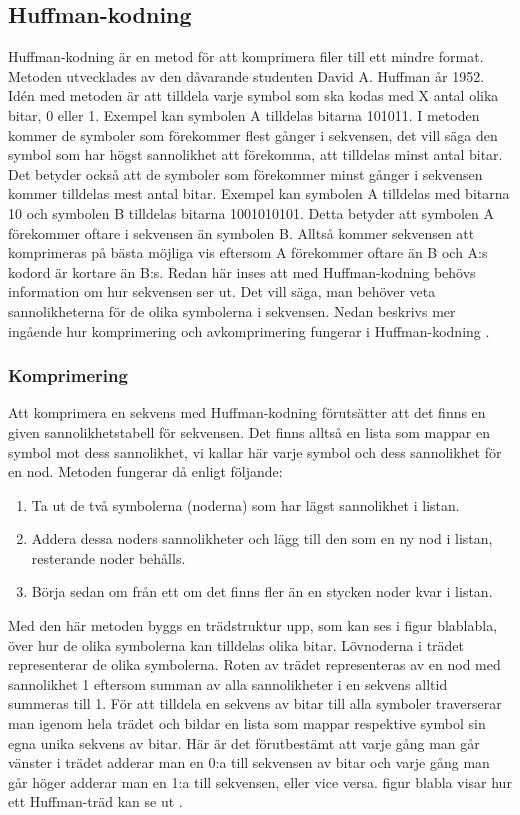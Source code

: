 \subsection{Huffman-kodning}
Huffman-kodning är en metod för att komprimera filer till ett mindre format. Metoden utvecklades av  den dåvarande studenten David A. Huffman år 1952. Idén med metoden är att tilldela varje symbol som ska kodas med X antal olika bitar, 0 eller 1. Exempel kan symbolen A tilldelas bitarna 101011. I metoden kommer de symboler som förekommer flest gånger i sekvensen, det vill säga den symbol som har högst sannolikhet att förekomma, att tilldelas minst antal bitar. Det betyder också att de symboler som förekommer minst gånger i sekvensen kommer tilldelas mest antal bitar. Exempel kan symbolen A tilldelas med bitarna 10 och symbolen B tilldelas bitarna 1001010101. Detta betyder att symbolen A förekommer oftare i sekvensen än symbolen B. Alltså kommer sekvensen att komprimeras på bästa möjliga vis eftersom A förekommer oftare än B och A:s kodord är kortare än B:s. Redan här inses att med Huffman-kodning behövs information om hur sekvensen ser ut. Det vill säga, man behöver veta sannolikheterna för de olika symbolerna i sekvensen. Nedan beskrivs mer ingående hur komprimering och avkomprimering fungerar i Huffman-kodning \cite{huffmancoding2018}.
	\subsubsection{Komprimering}
	Att komprimera en sekvens med Huffman-kodning förutsätter att det finns en given sannolikhetstabell för sekvensen. Det finns alltså en lista som mappar en symbol mot dess sannolikhet, vi kallar här varje symbol och dess sannolikhet för en nod. Metoden fungerar då enligt följande:
	\begin{enumerate}
	\item Ta ut de två symbolerna (noderna) som har lägst sannolikhet i listan.
	\item Addera dessa noders sannolikheter och lägg till den som en ny nod i listan, resterande noder behålls.
	\item Börja sedan om från ett om det finns fler än en stycken noder kvar i listan.
	\end{enumerate}
	Med den här metoden byggs en trädstruktur upp, som kan ses i figur blablabla, över hur de olika symbolerna kan tilldelas olika bitar. Lövnoderna i trädet representerar de olika symbolerna. Roten av trädet representeras av en nod med sannolikhet 1 eftersom summan av alla sannolikheter i en sekvens alltid summeras till 1. För att tilldela en sekvens av bitar till alla symboler traverserar man igenom hela trädet och bildar en lista som mappar respektive symbol sin egna unika sekvens av bitar. Här är det förutbestämt att varje gång man går vänster i trädet adderar man en 0:a till sekvensen av bitar och varje gång man går höger adderar man en 1:a till sekvensen, eller vice versa. figur blabla visar hur ett Huffman-träd kan se ut \cite{huffmancoding2018}.
	
